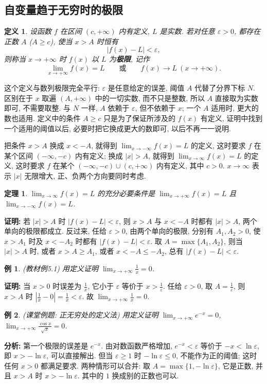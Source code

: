 \documentclass[UTF8,openany]{ctexbook}
\theoremstyle{chinesetextbook}
\newtheorem{definition}{定义}[section]
\newtheorem{example}{例}[section]
\newtheorem{theorem}{定理}[section]
\newenvironment{cnproof}{\par\indent\textbf{证明:} \ignorespaces}{\par}
\begin{document}
\subsection{自变量趋于无穷时的极限}
\begin{definition}
设函数 $f$ 在区间 $(c,+\infty)$ 内有定义, $L$ 是实数. 若对任意 $\varepsilon>0$, 都存在正数 $A$ ($A\ge c$), 使当 $x>A$ 时恒有
\[
|f(x)-L|<\varepsilon,
\]
则称当 $x\to+\infty$ 时 $f(x)$ 以 $L$ 为\textbf{极限}, 记作
\[
\lim_{x\to+\infty}f(x)=L\qquad\text{或}\qquad f(x)\to L\ (x\to+\infty).
\]
\end{definition}
这个定义与数列极限完全平行: $\varepsilon$ 是任意给定的误差, 阈值 $A$ 代替了分界下标 $N$. 区别在于 $x$ 取遍 $(A,+\infty)$ 中的一切实数, 而不只是整数, 所以 $A$ 直接取为实数即可, 不需要取整. 与 $N$ 一样, $A$ 依赖于 $\varepsilon$, 但不依赖于 $x$; 一个 $A$ 适用时, 更大的数也适用. 定义中的条件 $A\ge c$ 只是为了保证所涉及的 $f(x)$ 有定义, 证明中找到一个适用的阈值以后, 必要时把它换成更大的数即可, 以后不再一一说明.

把条件 $x>A$ 换成 $x<-A$, 就得到 $\displaystyle\lim_{x\to-\infty}f(x)=L$ 的定义, 这时要求 $f$ 在某个区间 $(-\infty,-c)$ 内有定义; 换成 $|x|>A$, 就得到 $\displaystyle\lim_{x\to\infty}f(x)=L$ 的定义, 这时要求 $f$ 在某个 $(-\infty,-c)\cup(c,+\infty)$ 内有定义, 其中 $c>0$. $x\to\infty$ 表示 $|x|$ 无限增大, 正、负两个方向要同时考虑.
\begin{theorem}
$\displaystyle\lim_{x\to\infty}f(x)=L$ 的充分必要条件是 $\displaystyle\lim_{x\to+\infty}f(x)=L$ 且 $\displaystyle\lim_{x\to-\infty}f(x)=L$.
\end{theorem}
\begin{cnproof}
若 $|x|>A$ 时 $|f(x)-L|<\varepsilon$, 则 $x>A$ 与 $x<-A$ 时都有 $|x|>A$, 两个单向的极限都成立. 反过来, 任给 $\varepsilon>0$, 由两个单向的极限, 分别有 $A_1,A_2>0$, 使 $x>A_1$ 时及 $x<-A_2$ 时都有 $|f(x)-L|<\varepsilon$. 取 $A=\max\{A_1,A_2\}$, 则当 $|x|>A$ 时, 或者 $x>A\ge A_1$, 或者 $x<-A\le-A_2$, 总有 $|f(x)-L|<\varepsilon$.
\end{cnproof}
\begin{example}
\textnormal{(教材例5.1)} 用定义证明 $\displaystyle\lim_{x\to+\infty}\frac1x=0$.
\end{example}
\begin{cnproof}
当 $x>0$ 时误差为 $\displaystyle\frac1x$, 它小于 $\varepsilon$ 等价于 $\displaystyle x>\frac1\varepsilon$. 任给 $\varepsilon>0$, 取 $\displaystyle A=\frac1\varepsilon$, 则 $x>A$ 时 $\displaystyle\left|\frac1x-0\right|=\frac1x<\varepsilon$. 故 $\displaystyle\lim_{x\to+\infty}\frac1x=0$.
\end{cnproof}
\begin{example}
\textnormal{(课堂例题: 正无穷处的定义法)} 用定义证明 $\displaystyle\lim_{x\to+\infty}e^{-x}=0$, $\displaystyle\lim_{x\to+\infty}\frac{\cos x}{\sqrt x}=0$.
\end{example}
\par\indent\textbf{分析:} 第一个极限的误差是 $e^{-x}$. 由对数函数严格增加, $e^{-x}<\varepsilon$ 等价于 $-x<\ln\varepsilon$, 即 $x>-\ln\varepsilon$, 可以直接解出. 但当 $\varepsilon\ge1$ 时 $-\ln\varepsilon\le0$, 不能作为正的阈值; 这时任何 $x>0$ 都满足要求. 两种情形可以合并: 取 $A=\max\{1,-\ln\varepsilon\}$, 它是正数, 并且 $x>A$ 时 $x>-\ln\varepsilon$. 其中的 $1$ 换成别的正数也可以.
\end{document}
